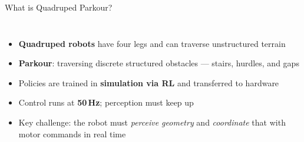\documentclass[aspectratio=169,10pt]{beamer}
\begin{document}
\begin{frame}{What is Quadruped Parkour?}
\begin{columns}[T]
  \begin{itemize}
    \setlength\itemsep{0.7em}
    \item \textbf{Quadruped robots} have four legs and can traverse unstructured terrain
    \item \textbf{Parkour}: traversing discrete structured obstacles ---
          stairs, hurdles, and gaps
    \item Policies are trained in \textbf{simulation via RL} and transferred to hardware
    \item Control runs at \textbf{50\,Hz}; perception must keep up
    \item Key challenge: the robot must \emph{perceive geometry} and
          \emph{coordinate} that with motor commands in real time
  \end{itemize}
\end{columns}
\end{frame}


\end{document}
